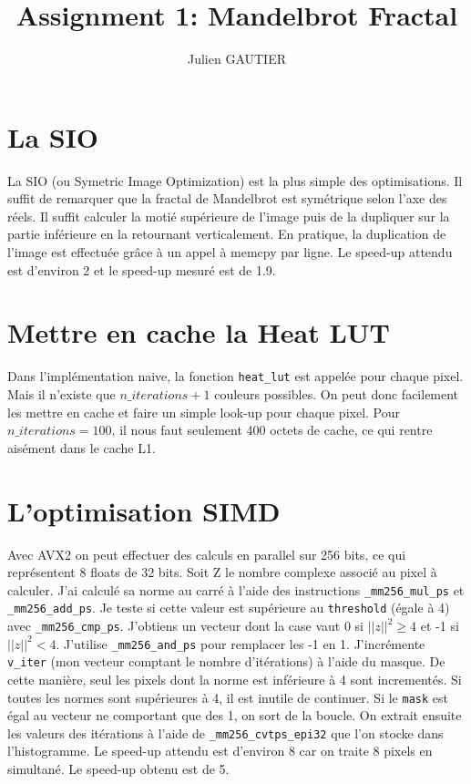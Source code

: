 \documentclass{article}
\title{Assignment 1: Mandelbrot Fractal}
\author{Julien GAUTIER}
\begin{document}
\maketitle

\section{La SIO}
La SIO (ou Symetric Image Optimization) est la plus simple des optimisations. Il suffit de remarquer que la fractal
de Mandelbrot est symétrique selon l’axe des réels. Il suffit calculer la motié supérieure de l’image puis de la
dupliquer sur la partie inférieure en la retournant verticalement. En pratique, la duplication de l’image est effectuée
grâce à un appel à memcpy par ligne. Le speed-up attendu est d’environ 2 et le speed-up mesuré est de 1.9.

\section{Mettre en cache la Heat LUT}
Dans l’implémentation naive, la fonction \texttt{heat\_lut} est appelée pour chaque pixel. Mais il n’existe que $n\_iterations+1$
couleurs possibles. On peut donc facilement les mettre en cache et faire un simple look-up pour chaque pixel. Pour
$n\_iterations = 100$, il nous faut seulement 400 octets de cache, ce qui rentre aisément dans le cache L1.

\section{L’optimisation SIMD}
Avec AVX2 on peut effectuer des calculs en parallel sur 256 bits, ce qui représentent 8 floats de 32 bits. Soit Z le
nombre complexe associé au pixel à calculer. J’ai calculé sa norme au carré à l’aide des instructions \texttt{\_mm256\_mul\_ps}
et \texttt{\_mm256\_add\_ps}. Je teste si cette valeur est supérieure au \texttt{threshold} (égale à 4) avec \texttt{\_mm256\_cmp\_ps}. J’obtiens
un vecteur dont la case vaut 0 si $||z||^2 \geq 4$ et -1 si $||z||^2 < 4$. J’utilise \texttt{\_mm256\_and\_ps} pour remplacer les -1 en
1. J’incrémente \texttt{v\_iter} (mon vecteur comptant le nombre d’itérations) à l’aide du masque. De cette manière, seul
les pixels dont la norme est inférieure à 4 sont incrementés. Si toutes les normes sont supérieures à 4, il est inutile
de continuer. Si le \texttt{mask} est égal au vecteur ne comportant que des 1, on sort de la boucle. On extrait ensuite les
valeurs des itérations à l’aide de \texttt{\_mm256\_cvtps\_epi32} que l’on stocke dans l’histogramme. Le speed-up attendu est
d’environ 8 car on traite 8 pixels en simultané. Le speed-up obtenu est de 5.
\end{document}
